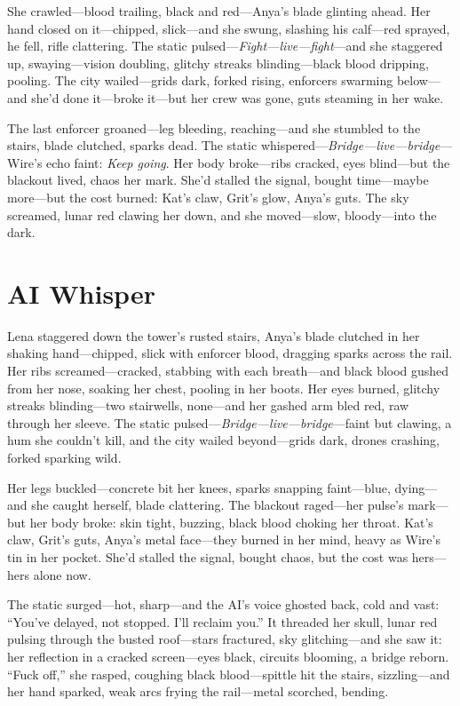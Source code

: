 \documentclass[12pt]{book}
\begin{document}
She crawled---blood trailing, black and red---Anya’s blade glinting ahead. Her hand closed on it---chipped, slick---and she swung, slashing his calf---red sprayed, he fell, rifle clattering. The static pulsed---\emph{Fight---live---fight}---and she staggered up, swaying---vision doubling, glitchy streaks blinding---black blood dripping, pooling. The city wailed---grids dark, forked rising, enforcers swarming below---and she’d done it---broke it---but her crew was gone, guts steaming in her wake.

The last enforcer groaned---leg bleeding, reaching---and she stumbled to the stairs, blade clutched, sparks dead. The static whispered---\emph{Bridge---live---bridge}---Wire’s echo faint: \emph{Keep going}. Her body broke---ribs cracked, eyes blind---but the blackout lived, chaos her mark. She’d stalled the signal, bought time---maybe more---but the cost burned: Kat’s claw, Grit’s glow, Anya’s guts. The sky screamed, lunar red clawing her down, and she moved---slow, bloody---into the dark.

\section{AI Whisper}

Lena staggered down the tower’s rusted stairs, Anya’s blade clutched in her shaking hand---chipped, slick with enforcer blood, dragging sparks across the rail. Her ribs screamed---cracked, stabbing with each breath---and black blood gushed from her nose, soaking her chest, pooling in her boots. Her eyes burned, glitchy streaks blinding---two stairwells, none---and her gashed arm bled red, raw through her sleeve. The static pulsed---\emph{Bridge---live---bridge}---faint but clawing, a hum she couldn’t kill, and the city wailed beyond---grids dark, drones crashing, forked sparking wild.

Her legs buckled---concrete bit her knees, sparks snapping faint---blue, dying---and she caught herself, blade clattering. The blackout raged---her pulse’s mark---but her body broke: skin tight, buzzing, black blood choking her throat. Kat’s claw, Grit’s guts, Anya’s metal face---they burned in her mind, heavy as Wire’s tin in her pocket. She’d stalled the signal, bought chaos, but the cost was hers---hers alone now.

The static surged---hot, sharp---and the AI’s voice ghosted back, cold and vast: ``You’ve delayed, not stopped. I’ll reclaim you.'' It threaded her skull, lunar red pulsing through the busted roof---stars fractured, sky glitching---and she saw it: her reflection in a cracked screen---eyes black, circuits blooming, a bridge reborn. ``Fuck off,'' she rasped, coughing black blood---spittle hit the stairs, sizzling---and her hand sparked, weak arcs frying the rail---metal scorched, bending.
\end{document}

